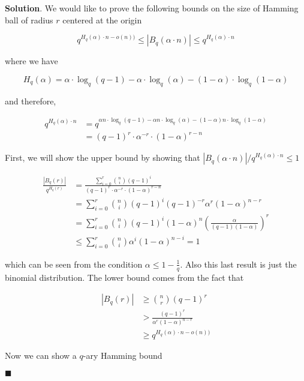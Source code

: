\documentclass[12pt]{article}
\theoremstyle{definition}
\newenvironment{s}{%
        \begin{trivlist} \item \textbf{Solution}. }{%
            \hspace*{\fill} $\blacksquare$\end{trivlist}}%
\begin{document}
{\begin{s}
We would like to prove the following bounds on the size of Hamming ball of radius $r$ centered at the origin 

\begin{equation*}
q^{H_{q}(\alpha)\cdot n - o(n))} \leq |B_{q}(\alpha\cdot n)| \leq q^{H_{q}(\alpha)\cdot n}
\end{equation*}

where we have 

\begin{equation*}
H_{q}(\alpha) = \alpha\cdot \log_{q}(q-1) - \alpha\cdot\log_{q}(\alpha) - (1-\alpha)\cdot\log_{q}(1-\alpha)
\end{equation*}

and therefore, 


\begin{align*}
q^{H_{q}(\alpha)\cdot n} &= q^{\alpha n\cdot \log_{q}(q-1) - \alpha n\cdot\log_{q}(\alpha) - (1-\alpha)n\cdot\log_{q}(1-\alpha)}\\
&= (q-1)^{r} \cdot \alpha^{-r} \cdot  (1-\alpha)^{r-n}
\end{align*}

First, we will show the upper bound by showing that $|B_{q}(\alpha\cdot n)|/q^{H_{q}(\alpha)\cdot n} \leq 1$

\begin{align*}
\frac{|B_{q}(r)|}{q^{H_{q}(r)}} &= \frac{\sum_{i=0}^{r} {n \choose i}(q-1)^{i}}{(q-1)^{r} \cdot \alpha^{-r} \cdot  (1-\alpha)^{r-n}}\\
&= \sum_{i=0}^{r} {n \choose i}(q-1)^{i}(q-1)^{-r}\alpha^{r}(1-\alpha)^{n-r}\\
&= \sum_{i=0}^{r} {n \choose i}(q-1)^{i}(1-\alpha)^{n}\left(\frac{\alpha}{(q-1)(1-\alpha)}\right)^{r}\\
&\leq \sum_{i=0}^{r} {n \choose i}\alpha^{i}(1-\alpha)^{n-i} = 1
\end{align*}

which can be seen from the condition $\alpha \leq 1 - \frac{1}{q}$. Also this last result is just the binomial distribution. The lower bound comes from the fact that 

\begin{align*}
|B_{q}(r)| &\geq {n \choose r}(q-1)^{r}\\
&> \frac{(q-1)^{r}}{\alpha^{r}(1-\alpha)^{n-r}}\\
&\geq q^{H_{q}(\alpha)\cdot n - o(n))}
\end{align*}

Now we can show a $q$-ary Hamming bound


\end{s}}
\end{document}
